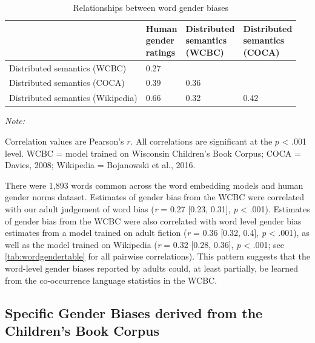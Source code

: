 \documentclass[english,,man,floatsintext]{apa6}
\begin{document}
\begin{table}

\caption{\label{tab:wordgendertable}Relationships between word gender biases}
\centering
\fontsize{7}{9}\selectfont
\begin{threeparttable}
\begin{tabular}[t]{llll}
\toprule
 & \makecell[l]{Human\\gender\\ratings} & \makecell[l]{Distributed\\semantics\\(WCBC)} & \makecell[l]{Distributed\\semantics\\(COCA)}\\
\midrule
Distributed semantics (WCBC) & 0.27 &  & \\
Distributed semantics (COCA) & 0.39 & 0.36 & \\
Distributed semantics (Wikipedia) & 0.66 & 0.32 & 0.42\\
\bottomrule
\end{tabular}
\begin{tablenotes}[para]
\item \textit{Note:} 
\item Correlation values are Pearson's $r$. All correlations are significant at the $p$ < .001 level. WCBC = model trained on Wisconsin Children’s Book Corpus; COCA = Davies, 2008; Wikipedia = Bojanowski et al., 2016.
\end{tablenotes}
\end{threeparttable}
\end{table}

There were 1,893 words common across the word embedding models and human gender norms dataset. Estimates of gender bias from the WCBC were correlated with our adult judgement of word bias (\emph{r} = 0.27 {[}0.23, 0.31{]}, \emph{p} \textless{} .001). Estimates of gender bias from the WCBC were also correlated with word level gender bias estimates from a model trained on adult fiction (\emph{r} = 0.36 {[}0.32, 0.4{]}, \emph{p} \textless{} .001), as well as the model trained on Wikipedia (\emph{r} = 0.32 {[}0.28, 0.36{]}, \emph{p} \textless{} .001; see \autoref{tab:wordgendertable} for all pairwise correlations). This pattern suggests that the word-level gender biases reported by adults could, at least partially, be learned from the co-occurrence language statistics in the WCBC.

\hypertarget{specific-gender-biases-derived-from-the-childrens-book-corpus}{%
\subsection{Specific Gender Biases derived from the Children's Book Corpus}\label{specific-gender-biases-derived-from-the-childrens-book-corpus}}
\end{document}
